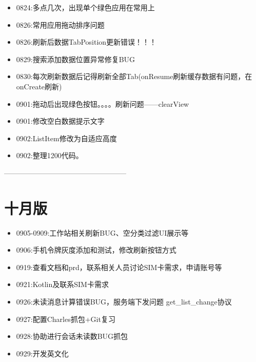 \documentclass{ctexart}
\begin{document}
\begin{itemize}
		\item 0824:多点几次，出现单个绿色应用在常用上
		\item 0826:常用应用拖动排序问题
		\item 0826:刷新后数据TabPosition更新错误！！！
		\item 0829:搜索添加数据位置异常修复BUG
		\item 0830:每次刷新数据后记得刷新全部Tab(onResume刷新缓存数据有问题，在onCreate刷新)
		\item 0901:拖动后出现绿色按钮。。。。刷新问题——clearView
		\item 0901:修改空白数据提示文字
		\item 0902:ListItem修改为自适应高度
		
		\item 0902:整理1200代码。
	\end{itemize}
	—————————————————
	\newpage
	\section{十月版}
	\begin{itemize}
		\item 0905-0909:工作站相关刷新BUG、空分类过滤UI展示等
		\item 0906:手机令牌灰度添加和测试，修改刷新按钮方式
		\item 0919:查看文档和prd，联系相关人员讨论SIM卡需求，申请账号等
		\item 0921:Kotlin及联系SIM卡需求
		\item 0926:未读消息计算错误BUG，服务端下发问题
		\newline get\_list\_change协议
		\item 0927:配置Charles抓包+Git复习
		\item 0928:协助进行会话未读数BUG抓包
		\item 0929:开发英文化
		
	\end{itemize}
\end{document}
